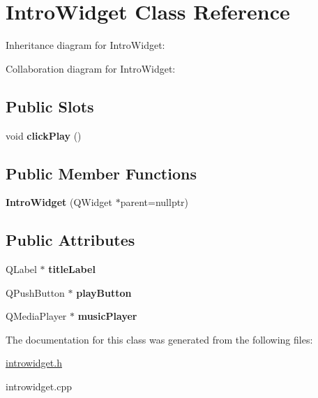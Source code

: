\hypertarget{classIntroWidget}{}\section{Intro\+Widget Class Reference}
\label{classIntroWidget}


Inheritance diagram for Intro\+Widget\+:


Collaboration diagram for Intro\+Widget\+:
\subsection*{Public Slots}
\begin{DoxyCompactItemize}
\item 
\mbox{\label{classIntroWidget_a61b2c8d7931311e5a1fecb3dbe83b46b}} 
void {\bfseries click\+Play} ()
\end{DoxyCompactItemize}
\subsection*{Public Member Functions}
\begin{DoxyCompactItemize}
\item 
\mbox{\label{classIntroWidget_ab277695dd0d142366b8dd07eaca86b90}} 
{\bfseries Intro\+Widget} (Q\+Widget $\ast$parent=nullptr)
\end{DoxyCompactItemize}
\subsection*{Public Attributes}
\begin{DoxyCompactItemize}
\item 
\mbox{\label{classIntroWidget_a7334648aee88b10a0121d64119870ddb}} 
Q\+Label $\ast$ {\bfseries title\+Label}
\item 
\mbox{\label{classIntroWidget_a66a1ef5fb2f9d703d1165f5819e9d49c}} 
Q\+Push\+Button $\ast$ {\bfseries play\+Button}
\item 
\mbox{\label{classIntroWidget_a516359740b041ac4f0f9411699c4186c}} 
Q\+Media\+Player $\ast$ {\bfseries music\+Player}
\end{DoxyCompactItemize}


The documentation for this class was generated from the following files\+:\begin{DoxyCompactItemize}
\item 
\hyperlink{introwidget_8h}{introwidget.\+h}\item 
introwidget.\+cpp\end{DoxyCompactItemize}
